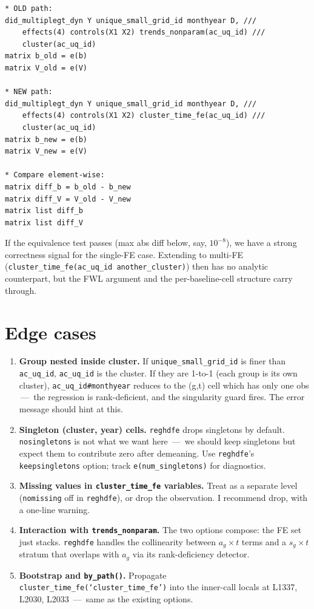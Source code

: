 \documentclass[11pt]{article}
\newcommand{\code}[1]{\texttt{\small #1}}
\newcommand{\1}{\mathbb{1}}
\begin{document}
\begin{lstlisting}
* OLD path:
did_multiplegt_dyn Y unique_small_grid_id monthyear D, ///
    effects(4) controls(X1 X2) trends_nonparam(ac_uq_id) ///
    cluster(ac_uq_id)
matrix b_old = e(b)
matrix V_old = e(V)

* NEW path:
did_multiplegt_dyn Y unique_small_grid_id monthyear D, ///
    effects(4) controls(X1 X2) cluster_time_fe(ac_uq_id) ///
    cluster(ac_uq_id)
matrix b_new = e(b)
matrix V_new = e(V)

* Compare element-wise:
matrix diff_b = b_old - b_new
matrix diff_V = V_old - V_new
matrix list diff_b
matrix list diff_V
\end{lstlisting}

\noindent
If the equivalence test passes (max abs diff below, say, $10^{-8}$), we have
a strong correctness signal for the single-FE case. Extending to multi-FE
(\code{cluster\_time\_fe(ac\_uq\_id another\_cluster)}) then has no
analytic counterpart, but the FWL argument and the per-baseline-cell
structure carry through.

\section{Edge cases}

\begin{enumerate}[leftmargin=*, itemsep=2pt]
\item \textbf{Group nested inside cluster.} If
      \code{unique\_small\_grid\_id} is finer than \code{ac\_uq\_id},
      \code{ac\_uq\_id} is the cluster. If they are 1-to-1 (each group is
      its own cluster), \code{ac\_uq\_id\#monthyear} reduces to the (g,t)
      cell which has only one obs \,---\, the regression is rank-deficient,
      and the singularity guard fires. The error message should hint at this.
\item \textbf{Singleton (cluster, year) cells.} \texttt{reghdfe} drops
      singletons by default. \code{nosingletons} is not what we want here
      \,---\, we should keep singletons but expect them to contribute zero
      after demeaning. Use \texttt{reghdfe}'s \code{keepsingletons} option;
      track \code{e(num\_singletons)} for diagnostics.
\item \textbf{Missing values in \code{cluster\_time\_fe} variables.}
      Treat as a separate level (\code{nomissing} off in \texttt{reghdfe}),
      or drop the observation. I recommend drop, with a one-line warning.
\item \textbf{Interaction with \texttt{trends\_nonparam}.} The two options
      compose: the FE set just stacks. \texttt{reghdfe} handles the
      collinearity between $a_g\times t$ terms and a $s_g\times t$ stratum
      that overlaps with $a_g$ via its rank-deficiency detector.
\item \textbf{Bootstrap and \texttt{by\_path()}.} Propagate
      \code{cluster\_time\_fe(`cluster\_time\_fe')} into the inner-call
      locals at L1337, L2030, L2033 \,---\, same as the existing options.
\end{enumerate}
\end{document}
